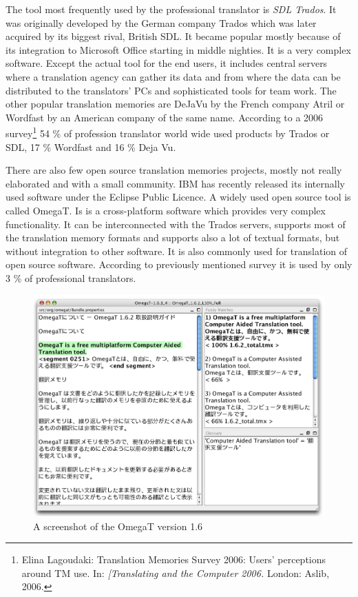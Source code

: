 The tool most frequently used by the professional translator is \emph{SDL Trados}. It was originally developed by the German company Trados which was later acquired by its biggest rival, British SDL. It became popular mostly because of its integration to Microsoft Office starting in middle nighties. It is a very complex software. Except the actual tool for the end users, it includes central servers where a translation agency can gather its data and from where the data can be distributed to the translators' PCs and sophisticated tools for team work. The other popular translation memories are DeJaVu by the French company Atril or Wordfast by an American company of the same name. According to a 2006 survey\footnote{Elina Lagoudaki: Translation Memories Survey 2006: 
Users' perceptions around TM use. In: \emph{[Translating and the Computer 2006.} London: Aslib, 2006.} 54 \% of profession translator world wide used products by Trados or SDL, 17 \% Wordfast and 16 \% Deja Vu.

There are also few open source translation memories projects, mostly not really elaborated and with a small community. IBM has recently released its internally used software under the Eclipse Public Licence. A widely used open source tool is called OmegaT. Is is a cross-platform software which provides very complex functionality. It can be interconnected with the Trados servers, supports most of the translation memory formats and supports also a lot of textual formats, but without integration to other software. It is also commonly used for translation of open source software. According to previously mentioned survey it is used by only 3 \% of professional translators.

\begin{figure}
\begin{center}
\includegraphics[scale=.4]{./figures/omegat.png}
\end{center}

\caption{A screenshot of the OmegaT version 1.6}

\end{figure}

